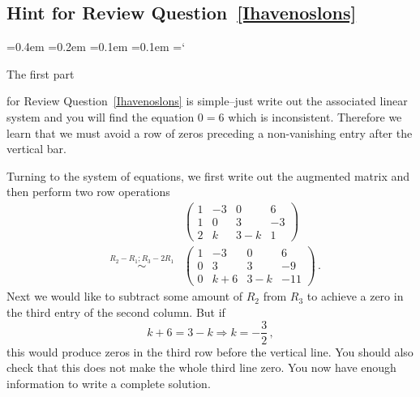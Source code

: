 
\subsection*{Hint for Review Question~\ref*{Ihavenoslons}}

{\ttfamily
{}\font=0.4em
\font=0.2em
\font=0.1em
\font=0.1em
\hyphenchar\font=`\-





\hypertarget{video_elementary_row_operations_hint}{The first part} for Review Question~\ref{Ihavenoslons} is simple--just 
write out the associated linear system and you will find the equation $0=6$ which is inconsistent. Therefore we learn 
that we must avoid a row of zeros preceding a non-vanishing entry after the vertical bar.

Turning to the system of equations, we first write out the augmented matrix and then perform two row operations
\begin{eqnarray*}
&&\left(\begin{array}{ccc|c}1&-3&0&6\\1&0&3&-3\\2&k&3-k&1\end{array}\right)\\[2mm]
&\stackrel{R_2-R_1;R_3-2R_1}\sim&
\left(\begin{array}{ccc|c}1&-3&0&6\\0&3&3&-9\\0&k+6&3-k&-11\end{array}\right)\, .
\end{eqnarray*}
Next we would like to subtract some amount of $R_2$ from $R_3$ to achieve a zero in the third entry of the second column. But if 
\[k+6=3-k\Rightarrow k=-\frac32\, ,\]
this would produce zeros in the third row before the vertical line.
You should also check that this does not make the whole third line zero. You now have enough information to write a complete solution.


}

